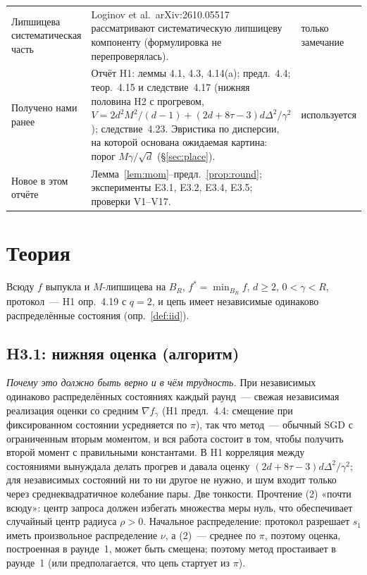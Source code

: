 \documentclass[11pt,a4paper]{article}
\numberwithin{equation}{section}
\theoremstyle{definition}
\theoremstyle{remark}
\begin{document}
\begin{center}
\begin{tabularx}{\textwidth}{@{}p{2.6cm}Xp{2.5cm}@{}}
Липшицева систематическая часть & Loginov et al.\ arXiv:2610.05517 рассматривают систематическую липшицеву компоненту (формулировка не перепроверялась). & только замечание \\
Получено нами ранее & Отчёт H1: леммы 4.1, 4.3, 4.14(a); предл.~4.4; теор.~4.15 и следствие~4.17 (нижняя половина H2 с прогревом, $V=2d^2M^2/(d-1)+(2d+8\tau-3)d\Delta^2/\gamma^2$); следствие~4.23. Эвристика по дисперсии, на которой основана ожидаемая картина: порог $M\gamma/\sqrt d$ (\S\ref{sec:place}). & используется \\
Новое в этом отчёте & Лемма~\ref{lem:mom}--предл.~\ref{prop:round}; эксперименты E3.1, E3.2, E3.4, E3.5; проверки V1--V17. & \\
\bottomrule
\end{tabularx}
\end{center}
\section{Теория}\label{sec:theory}
Всюду $f$ выпукла и $M$-липшицева на $B_R$, $f^*=\min_{B_R}f$, $d\ge2$, $0<\gamma<R$, протокол~--- H1 опр.~4.19 с $q=2$, и цепь имеет независимые одинаково распределённые состояния (опр.~\ref{def:iid}).

\subsection{H3.1: нижняя оценка (алгоритм)}\label{sec:lower}
\emph{Почему это должно быть верно и в чём трудность.} При независимых одинаково распределённых состояниях каждый раунд~--- свежая независимая реализация оценки со средним $\nabla f_\gamma$ (H1 предл.~4.4: смещение при фиксированном состоянии усредняется по $\pi$), так что метод~--- обычный SGD с ограниченным вторым моментом, и вся работа состоит в том, чтобы получить второй момент с правильными константами. В H1 корреляция между состояниями вынуждала делать прогрев и давала оценку $(2d+8\tau-3)d\Delta^2/\gamma^2$; для независимых состояний ни то ни другое не нужно, и шум входит только через среднеквадратичное колебание пары. Две тонкости. Прочтение (2) «почти всюду»: центр запроса должен избегать множества меры нуль, что обеспечивает случайный центр радиуса $\rho>0$. Начальное распределение: протокол разрешает $s_1$ иметь произвольное распределение $\nu$, а (2)~--- среднее по $\pi$, поэтому оценка, построенная в раунде~1, может быть смещена; поэтому метод простаивает в раунде~1 (или предполагается, что цепь стартует из $\pi$).
\end{document}
